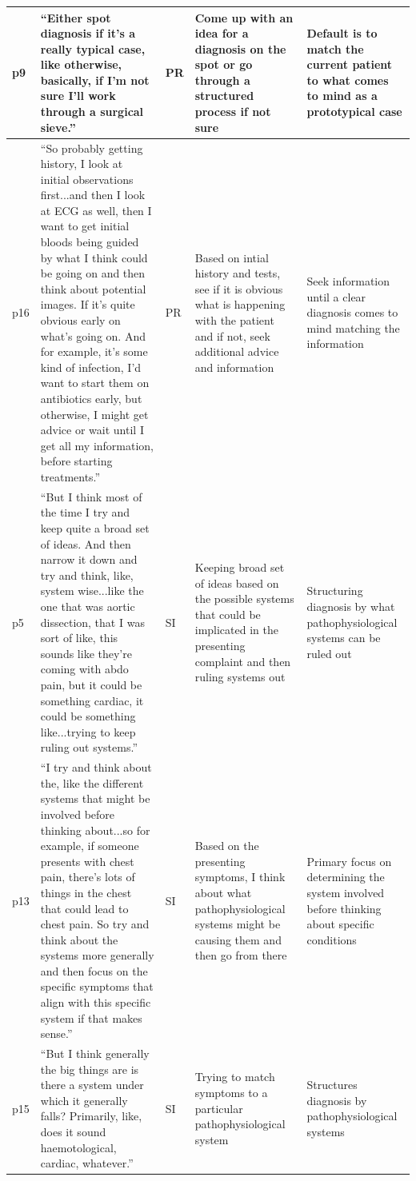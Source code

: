 \documentclass[a4paper, nobind]{templates/ociamthesis}
\begin{document}
\begin{longtable}[t]{>{\raggedright\arraybackslash}p{5em}|>{\raggedright\arraybackslash}p{14em}|>{\raggedright\arraybackslash}p{3em}|>{\raggedright\arraybackslash}p{6em}|>{\raggedright\arraybackslash}p{6em}}
\hline
p9 & “Either spot diagnosis if it's a really typical case, like otherwise, basically, if I'm not sure I'll work through a surgical sieve.” & PR & Come up with an idea for a diagnosis on the spot or go through a structured process if not sure & Default is to match the current patient to what comes to mind as a prototypical case\\
\hline
p16 & “So probably getting history, I look at initial observations first...and then I look at ECG as well, then I want to get initial bloods being guided by what I think could be going on and then think about potential images. If it's quite obvious early on what's going on. And for example, it's some kind of infection, I'd want to start them on antibiotics early, but otherwise, I might get advice or wait until I get all my information, before starting treatments.” & PR & Based on intial history and tests, see if it is obvious what is happening with the patient and if not, seek additional advice and information & Seek information until a clear diagnosis comes to mind matching the information\\
\hline
p5 & “But I think most of the time I try and keep quite a broad set of ideas. And then narrow it down and try and think, like, system wise...like the one that was aortic dissection, that I was sort of like, this sounds like they're coming with abdo pain, but it could be something cardiac, it could be something like...trying to keep ruling out systems.” & SI & Keeping broad set of ideas based on the possible systems that could be implicated in the presenting complaint and then ruling systems out & Structuring diagnosis by what pathophysiological systems can be ruled out\\
\hline
p13 & “I try and think about the, like the different systems that might be involved before thinking about...so for example, if someone presents with chest pain, there's lots of things in the chest that could lead to chest pain. So try and think about the systems more generally and then focus on the specific symptoms that align with this specific system if that makes sense.” & SI & Based on the presenting symptoms, I think about what pathophysiological systems might be causing them and then go from there & Primary focus on determining the system involved before thinking about specific conditions\\
\hline
p15 & “But I think generally the big things are is there a system under which it generally falls? Primarily, like, does it sound haemotological, cardiac, whatever.” & SI & Trying to match symptoms to a particular pathophysiological system & Structures diagnosis by pathophysiological systems\\
\hline
\end{longtable}
\end{document}
